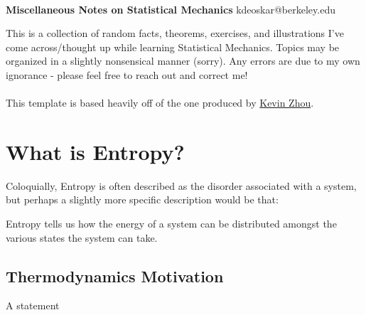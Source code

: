 \documentclass[11pt]{article}
\begin{document}
\thispagestyle{empty}
\bigskip \
\vspace{0.1cm}

\begin{center}
{\fontsize{30}{30} \selectfont \bf \sffamily Miscellaneous Notes on Statistical Mechanics}
\vskip 6pt
{\fontsize{14}{14} \selectfont \ttfamily kdeoskar@berkeley.edu} 
\vskip 24pt
\end{center}



This is a collection of random facts, theorems, exercises, and illustrations I've come across/thought up while learning Statistical Mechanics. Topics may be organized in a slightly nonsensical manner (sorry). Any errors are due to my own ignorance - please feel free to reach out and correct me!
\\
\\
This template is based heavily off of the one produced by \href{https://knzhou.github.io/}{Kevin Zhou}.

\setcounter{tocdepth}{3}
\tableofcontents 


\newpage
\section{What is Entropy?}

Coloquially, Entropy is often described as the disorder associated with a system, but perhaps a slightly more specific description would be that:
\begin{dottedbox}
  Entropy tells us how the energy of a system can be distributed amongst the various states the system can take. 
\end{dottedbox}

\subsection{Thermodynamics Motivation}
A statement \cite{BlundellThermal10}





\newpage
\end{document}
